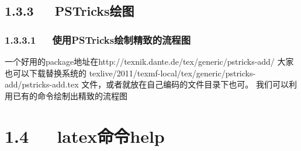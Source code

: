 \documentclass[letterpaper,12pt,english]{sphinxmanual}
\begin{document}
\subsection{1.3.3   PSTricks绘图}
\label{\detokenize{001software/001install/LaTex:pstricks}}

\subsubsection{1.3.3.1   使用PSTricks绘制精致的流程图}
\label{\detokenize{001software/001install/LaTex:id5}}
一个好用的package地址在http://texnik.dante.de/tex/generic/pstricks-add/  大家也可以下载替换系统的 texlive/2011/texmf-local/tex/generic/pstricks-add/pstricks-add.tex 文件，或者就放在自己编码的文件目录下也可。
我们可以利用已有的命令绘制出精致的流程图


\section{1.4   latex命令help}
\label{\detokenize{001software/001install/LaTex:latexhelp}}
\end{document}
